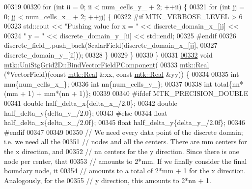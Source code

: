 \begin{DoxyCode}
00319 
00320   \textcolor{keywordflow}{for} (\textcolor{keywordtype}{int} ii = 0; ii < num\_cells\_y\_ + 2; ++ii) \{
00321     \textcolor{keywordflow}{for} (\textcolor{keywordtype}{int} jj = 0; jj < num\_cells\_x\_ + 2; ++jj) \{
00322 \textcolor{preprocessor}{      #if MTK\_VERBOSE\_LEVEL > 6}
00323       std::cout << \textcolor{stringliteral}{"Pushing value for x = "} << discrete\_domain\_x\_[jj] <<
00324         \textcolor{stringliteral}{" y = "} << discrete\_domain\_y\_[ii] << std::endl;
00325 \textcolor{preprocessor}{      #endif}
00326       discrete\_field\_.push\_back(ScalarField(discrete\_domain\_x\_[jj],
00327                                             discrete\_domain\_y\_[ii]));
00328     \}
00329   \}
00330 \}
00331 
\hypertarget{mtk__uni__stg__grid__2d_8cc_source_l00332}{}\hyperlink{classmtk_1_1UniStgGrid2D_a47b92d03ef5ed2b1ed28091a424f8f52}{00332} \textcolor{keywordtype}{void} \hyperlink{classmtk_1_1UniStgGrid2D_a47b92d03ef5ed2b1ed28091a424f8f52}{mtk::UniStgGrid2D::BindVectorFieldPComponent}(
00333   \hyperlink{group__c01-roots_gac080bbbf5cbb5502c9f00405f894857d}{mtk::Real} (*VectorField)(\textcolor{keyword}{const} \hyperlink{group__c01-roots_gac080bbbf5cbb5502c9f00405f894857d}{mtk::Real} &xx, \textcolor{keyword}{const} 
      \hyperlink{group__c01-roots_gac080bbbf5cbb5502c9f00405f894857d}{mtk::Real} &yy)) \{
00334 
00335   \textcolor{keywordtype}{int} mm\{num\_cells\_x\_\};
00336   \textcolor{keywordtype}{int} nn\{num\_cells\_y\_\};
00337 
00338   \textcolor{keywordtype}{int} total\{nn*(mm + 1) + mm*(nn + 1)\};
00339 
00340 \textcolor{preprocessor}{  #ifdef MTK\_PRECISION\_DOUBLE}
00341   \textcolor{keywordtype}{double} half\_delta\_x\{delta\_x\_/2.0\};
00342   \textcolor{keywordtype}{double} half\_delta\_y\{delta\_y\_/2.0\};
00343 \textcolor{preprocessor}{  #else}
00344   \textcolor{keywordtype}{float} half\_delta\_x\{delta\_x\_/2.0f\};
00345   \textcolor{keywordtype}{float} half\_delta\_y\{delta\_y\_/2.0f\};
00346 \textcolor{preprocessor}{  #endif}
00347 
00349 
00350   \textcolor{comment}{// We need every data point of the discrete domain; i.e. we need all the}
00351   \textcolor{comment}{// nodes and all the centers. There are mm centers for the x direction, and}
00352   \textcolor{comment}{// nn centers for the y direction. Since there is one node per center, that}
00353   \textcolor{comment}{// amounts to 2*mm. If we finally consider the final boundary node, it}
00354   \textcolor{comment}{// amounts to a total of 2*mm + 1 for the x direction. Analogously, for the}
00355   \textcolor{comment}{// y direction, this amounts to 2*nn + 1.}

\end{DoxyCode}
